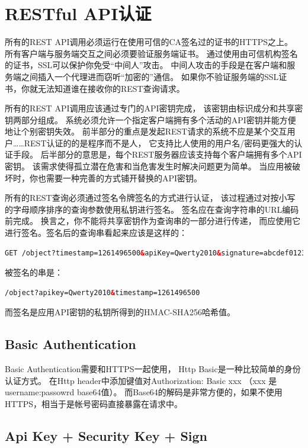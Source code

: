 \documentclass{book}
\begin{document}
\section{RESTful API认证}

所有的REST API调用必须运行在使用可信的CA签名过的证书的HTTPS之上。
所有客户端与服务端交互之间必须要验证服务端证书。
通过使用由可信机构签名的证书，SSL可以保护你免受“中间人”攻击。
中间人攻击的手段是在客户端和服务端之间插入一个代理进而窃听“加密的”通信。
如果你不验证服务端的SSL证书，你就无法知道谁在接收你的REST查询请求。

所有的REST API调用应该通过专门的API密钥完成，
该密钥由标识成分和共享密钥两部分组成。
系统必须允许一个指定客户端拥有多个活动的API密钥并能方便地让个别密钥失效。
前半部分的重点是发起REST请求的系统不应是某个交互用户……REST认证的的是程序而不是人，
它支持比人使用的用户名/密码更强大的认证手段。
后半部分的意思是，每个REST服务器应该支持每个客户端拥有多个API密钥。
该需求使得孤立潜在危害和当危害发生时解决问题更为简单。
当应用被破坏时，你也需要一种完善的方式铺开替换的API密钥。

所有的REST查询必须通过签名令牌签名的方式进行认证，
该过程通过对按小写的字母顺序排序的查询参数使用私钥进行签名。
签名应在查询字符串的URL编码前完成。
换言之，你不能将共享密钥作为查询串的一部分进行传递，
而应使用它进行签名。签名后的查询串看起来应该是这样的：

\begin{lstlisting}[language=HTML]
GET /object?timestamp=1261496500&apiKey=Qwerty2010&signature=abcdef0123456789
\end{lstlisting}
   
被签名的串是：

\begin{lstlisting}[language=HTML]
/object?apikey=Qwerty2010&timestamp=1261496500
\end{lstlisting}

而签名是应用API密钥的私钥所得到的HMAC-SHA256哈希值。

\subsection{Basic Authentication}

Basic Authentication需要和HTTPS一起使用，
Http Basic是一种比较简单的身份认证方式。
在Http header中添加键值对Authorization: Basic xxx （xxx 是 username:passowrd base64值）。
而Base64的解码是非常方便的，如果不使用HTTPS，相当于是帐号密码直接暴露在请求中。

\subsection{Api Key + Security Key + Sign}
\end{document}

